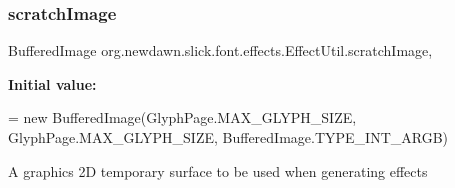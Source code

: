 \subsubsection{\texorpdfstring{scratch\+Image}{scratchImage}}
{\footnotesize\ttfamily Buffered\+Image org.\+newdawn.\+slick.\+font.\+effects.\+Effect\+Util.\+scratch\+Image\hspace{0.3cm}{\ttfamily [static]}, {\ttfamily [private]}}

{\bfseries Initial value\+:}
\begin{DoxyCode}
= \textcolor{keyword}{new} BufferedImage(GlyphPage.MAX\_GLYPH\_SIZE, GlyphPage.MAX\_GLYPH\_SIZE,
        BufferedImage.TYPE\_INT\_ARGB)
\end{DoxyCode}
A graphics 2D temporary surface to be used when generating effects 
